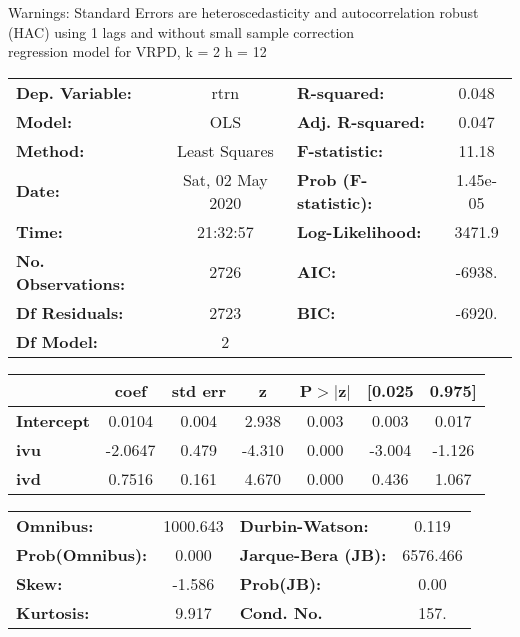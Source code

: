 Warnings: \newline
 [1] Standard Errors are heteroscedasticity and autocorrelation robust (HAC) using 1 lags and without small sample correction\\ 

regression model for VRPD, k = 2 h = 12\begin{center}
\begin{tabular}{lclc}
\toprule
\textbf{Dep. Variable:}    &       rtrn       & \textbf{  R-squared:         } &     0.048   \\
\textbf{Model:}            &       OLS        & \textbf{  Adj. R-squared:    } &     0.047   \\
\textbf{Method:}           &  Least Squares   & \textbf{  F-statistic:       } &     11.18   \\
\textbf{Date:}             & Sat, 02 May 2020 & \textbf{  Prob (F-statistic):} &  1.45e-05   \\
\textbf{Time:}             &     21:32:57     & \textbf{  Log-Likelihood:    } &    3471.9   \\
\textbf{No. Observations:} &        2726      & \textbf{  AIC:               } &    -6938.   \\
\textbf{Df Residuals:}     &        2723      & \textbf{  BIC:               } &    -6920.   \\
\textbf{Df Model:}         &           2      & \textbf{                     } &             \\
\bottomrule
\end{tabular}
\begin{tabular}{lcccccc}
                   & \textbf{coef} & \textbf{std err} & \textbf{z} & \textbf{P$> |$z$|$} & \textbf{[0.025} & \textbf{0.975]}  \\
\midrule
\textbf{Intercept} &       0.0104  &        0.004     &     2.938  &         0.003        &        0.003    &        0.017     \\
\textbf{ivu}       &      -2.0647  &        0.479     &    -4.310  &         0.000        &       -3.004    &       -1.126     \\
\textbf{ivd}       &       0.7516  &        0.161     &     4.670  &         0.000        &        0.436    &        1.067     \\
\bottomrule
\end{tabular}
\begin{tabular}{lclc}
\textbf{Omnibus:}       & 1000.643 & \textbf{  Durbin-Watson:     } &    0.119  \\
\textbf{Prob(Omnibus):} &   0.000  & \textbf{  Jarque-Bera (JB):  } & 6576.466  \\
\textbf{Skew:}          &  -1.586  & \textbf{  Prob(JB):          } &     0.00  \\
\textbf{Kurtosis:}      &   9.917  & \textbf{  Cond. No.          } &     157.  \\
\bottomrule
\end{tabular}
\end{center}

